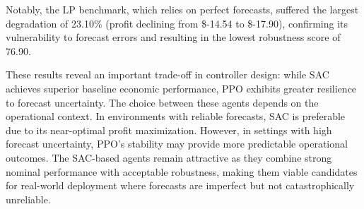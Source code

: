 Notably, the LP benchmark, which relies on perfect forecasts, suffered the largest degradation of 23.10\% (profit declining from \$-14.54 to \$-17.90), confirming its vulnerability to forecast errors and resulting in the lowest robustness score of 76.90.

These results reveal an important trade-off in controller design: while SAC achieves superior baseline economic performance, PPO exhibits greater resilience to forecast uncertainty. The choice between these agents depends on the operational context. In environments with reliable forecasts, SAC is preferable due to its near-optimal profit maximization. However, in settings with high forecast uncertainty, PPO's stability may provide more predictable operational outcomes. The SAC-based agents remain attractive as they combine strong nominal performance with acceptable robustness, making them viable candidates for real-world deployment where forecasts are imperfect but not catastrophically unreliable.

